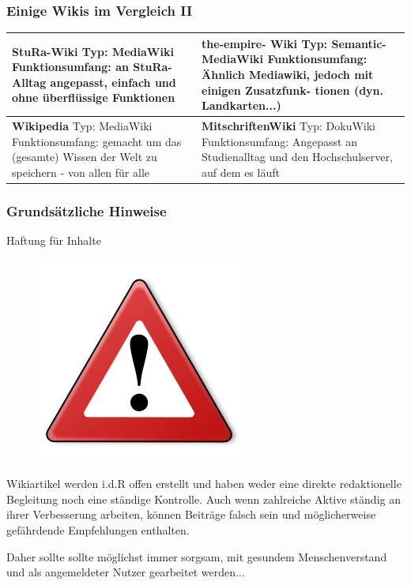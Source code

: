 \documentclass{beamer}
\begin{document}
\begin{frame}
  \frametitle{Einige Wikis im Vergleich II}

  \begin{table}
    \caption{Wikivergleich2}
    \label{tab:Wikivergleich2}

    \begin{center}
      \begin{longtable}{|l|l|}
        \hline
        \textbf{StuRa-Wiki} Typ: MediaWiki Funktionsumfang: an StuRa- Alltag angepasst, einfach und ohne überflüssige Funktionen & \textbf{the-empire- Wiki} Typ: Semantic-MediaWiki Funktionsumfang: Ähnlich Mediawiki, jedoch mit einigen Zusatzfunk- tionen (dyn. Landkarten...) \\ 
        \hline
        \textbf{Wikipedia} Typ: MediaWiki Funktionsumfang: gemacht um das (gesamte) Wissen der Welt zu speichern - von allen für alle & \textbf{MitschriftenWiki} Typ: DokuWiki Funktionsumfang: Angepasst an Studienalltag und den Hochschulserver, auf dem es läuft \\ 
        \hline
      \end{longtable}
    \end{center}
  \end{table}

\end{frame}


\begin{frame}
  \frametitle{Grundsätzliche Hinweise}{Haftung für Inhalte}

\begin{figure}
      \includegraphics[scale=0.25]{Warning_256px}
      \label{fig:Warnschild}
  \end{figure}  
 
  \begin{block}{}
    Wikiartikel werden i.d.R offen erstellt und haben weder eine direkte redaktionelle
    Begleitung noch eine ständige Kontrolle. Auch wenn zahlreiche Aktive
    ständig an ihrer Verbesserung arbeiten, können Beiträge falsch sein und
    möglicherweise gefährdende Empfehlungen enthalten.
  \end{block}
  \begin{block}{}
    Daher sollte sollte möglichst immer sorgsam, mit gesundem
    Menschenverstand und als angemeldeter Nutzer gearbeitet werden...
  \end{block}
\end{frame}
\end{document}
